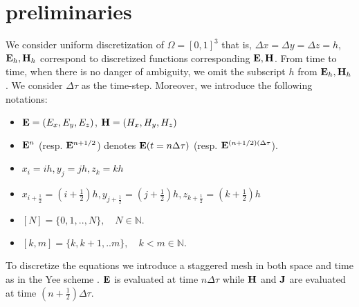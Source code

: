 \documentclass[12pt,reqno]{amsart}
\newcommand{\N}{\mathbb{N}}
\newcommand{\e}{{\bf E}}
\newcommand{\h}{{\bf H}}
\newtheorem{remark}[theorem]{Remark}
\theoremstyle{definition}
\numberwithin{equation}{section}
\def\Gw{\Omega}     \def\Gx{\Xi}         \def\Gy{\Psi}
\begin{document}
	\section{preliminaries}
	We consider uniform discretization of $\Gw=[0,1]^3$ that is,
	 $\Delta x=\Delta y=\Delta z=h$,
	 $\e_h, \h_h$ correspond to discretized functions corresponding $\e,\h$.
	 From time to time, when there is no danger of ambiguity, we omit the subscript $h$ from $\e_h,\h_h$.
	 We consider $\Delta \tau $ as the time-step.
	Moreover, we   introduce the following notations:
	\begin{itemize}
		\item $\e=(E_x,E_y,E_z)$, $\h=(H_x,H_y,H_z)$
		\item $\e^n$  (resp. $\e^{n+1/2}$) denotes $\e(t=n\Delta \tau)$ (resp. $\e^{(n+1/2)(\Delta \tau}$).
		\item $x_{i}=i h,y_{j}=j h,z_{k}=k h$ 
		\item $x_{i+\frac{1}{2}}=\left (i+\frac{1}{2}\right ) h, y_{j+\frac{1}{2}}=\left (j+\frac{1}{2}\right ) h, z_{k+\frac{1}{2}}=\left (k+\frac{1}{2}\right ) h$ 
		\item 	$[N]=\{0,1,..,N\},\quad N\in \N.$
				\item 	$[k,m]=\{k,k+1,..m\},\quad k<m\in \N.$
	\end{itemize}

	To discretize the equations we introduce a staggered mesh in both space and time as in the Yee scheme \cite{yee}. 
	$\e$ is  evaluated at time $n\Delta \tau$ while $\bf{H}$ and $\bf{J}$ are evaluated at time $(n\!+\! \frac{1}{2})\Delta \tau$.
\end{document}

